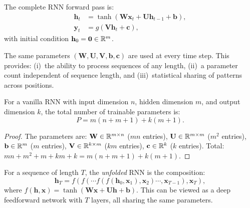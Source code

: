 \documentclass[11pt,a4paper]{article}
\begin{document}
\begin{keyresult}[title={RNN Forward Equations}]
The complete RNN forward pass is:
\begin{align}
  \mathbf{h}_t &= \tanh(\mathbf{W}\mathbf{x}_t +
    \mathbf{U}\mathbf{h}_{t-1} + \mathbf{b}),
    \label{eq:rnn-hidden} \\
  \mathbf{y}_t &= g(\mathbf{V}\mathbf{h}_t + \mathbf{c}),
    \label{eq:rnn-output}
\end{align}
with initial condition $\mathbf{h}_0 = \mathbf{0} \in \mathbb{R}^m$.
\end{keyresult}

\begin{remark}
\label{rem:param-sharing}
The same parameters $(\mathbf{W}, \mathbf{U}, \mathbf{V},
\mathbf{b}, \mathbf{c})$ are used at every time step.  This provides:
(i)~the ability to process sequences of any length,
(ii)~a parameter count independent of sequence length, and
(iii)~statistical sharing of patterns across positions.
\end{remark}

\begin{proposition}
\label{prop:param-count}
For a vanilla RNN with input dimension $n$, hidden dimension $m$,
and output dimension $k$, the total number of trainable parameters is:
\[
  P = m(n + m + 1) + k(m + 1).
\]
\end{proposition}

\begin{proof}
The parameters are: $\mathbf{W} \in \mathbb{R}^{m \times n}$ ($mn$
entries), $\mathbf{U} \in \mathbb{R}^{m \times m}$ ($m^2$ entries),
$\mathbf{b} \in \mathbb{R}^m$ ($m$ entries), $\mathbf{V} \in \mathbb{R}^{k \times m}$
($km$ entries), $\mathbf{c} \in \mathbb{R}^k$ ($k$ entries).  Total:
$mn + m^2 + m + km + k = m(n + m + 1) + k(m + 1)$.
\end{proof}

\begin{definition}
\label{def:unfolded}
For a sequence of length $T$, the \emph{unfolded} RNN is the
composition:
\[
  \mathbf{h}_T = f(f(\cdots f(f(\mathbf{h}_0, \mathbf{x}_1),
    \mathbf{x}_2) \cdots, \mathbf{x}_{T-1}), \mathbf{x}_T),
\]
where $f(\mathbf{h}, \mathbf{x}) = \tanh(\mathbf{W}\mathbf{x} +
\mathbf{U}\mathbf{h} + \mathbf{b})$.  This can be viewed as a deep
feedforward network with $T$ layers, all sharing the same parameters.
\end{definition}
\end{document}
